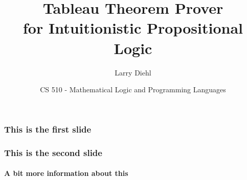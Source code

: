 \documentclass[mathserif]{beamer}
\title{Tableau Theorem Prover\\ for Intuitionistic Propositional Logic}
\author{Larry Diehl}
\institute{Portland State University}
\date[Fall 2014]
{CS 510 - Mathematical Logic and Programming Languages}
\begin{document}
\frame{\titlepage}

\begin{frame}
  \frametitle{This is the first slide}
\end{frame}

\begin{frame}
  \frametitle{This is the second slide}
  \framesubtitle{A bit more information about this}
\end{frame}
\end{document}
